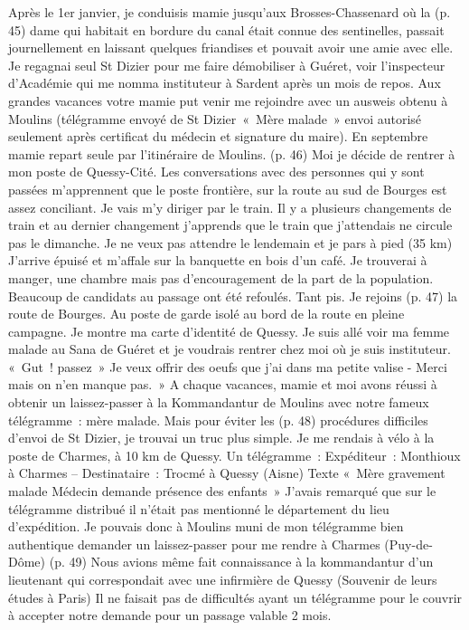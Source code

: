 \documentclass[a5paper,pagesize,10pt,bibtotoc,pointlessnumbers,
normalheadings,DIV=9,twoside=false]{scrbook}
\begin{document}
	Après le 1er janvier, je conduisis mamie jusqu’aux Brosses-Chassenard où la (p. 45) dame qui habitait en bordure du canal était connue des sentinelles, passait journellement en laissant quelques friandises et pouvait avoir une amie avec elle.
	Je regagnai seul St Dizier pour me faire démobiliser à Guéret, voir l’inspecteur d’Académie qui me nomma instituteur à Sardent après un mois de repos.
	Aux grandes vacances votre mamie put venir me rejoindre avec un ausweis obtenu à Moulins (télégramme envoyé de St Dizier « Mère malade » envoi autorisé seulement après certificat du médecin et signature du maire).
	En septembre mamie repart seule par l’itinéraire de Moulins. (p. 46) Moi je décide de rentrer à mon poste de Quessy-Cité. Les conversations avec des personnes qui y sont passées m’apprennent que le poste frontière, sur la route au sud de Bourges est assez conciliant. Je vais m’y diriger par le train. Il y a plusieurs changements de train et au dernier changement j’apprends que le train que j’attendais ne circule pas le dimanche. Je ne veux pas attendre le lendemain et je pars à pied (35 km) J’arrive épuisé et m’affale sur la banquette en bois d’un café. Je trouverai à manger, une chambre mais pas d’encouragement de la part de la population. Beaucoup de candidats au passage ont été refoulés. Tant pis.  Je rejoins (p. 47) la route de Bourges. Au poste de garde isolé au bord de la route en pleine campagne. Je montre ma carte d’identité de Quessy. Je suis allé voir ma femme malade au Sana de Guéret et je voudrais rentrer chez moi où je suis instituteur. « Gut ! passez » Je veux offrir des oeufs que j’ai dans ma petite valise 
	- Merci mais on n’en manque pas. » 
	A chaque vacances, mamie et moi avons réussi à obtenir un laissez-passer à la Kommandantur de Moulins avec notre fameux télégramme : mère malade.
	Mais pour éviter les (p. 48) procédures difficiles d’envoi de St Dizier, je trouvai un truc plus simple. Je me rendais à vélo à la poste de Charmes, à 10 km de Quessy. Un télégramme : Expéditeur : Monthioux à Charmes – Destinataire : Trocmé à Quessy (Aisne) Texte « Mère gravement malade Médecin demande présence des enfants »
	J’avais remarqué que sur le télégramme distribué il n’était pas mentionné le département du lieu d’expédition. Je pouvais donc à Moulins muni de mon télégramme bien authentique demander un laissez-passer pour me rendre à Charmes (Puy-de-Dôme) (p. 49) Nous avions même fait connaissance à la kommandantur d’un lieutenant qui correspondait avec une infirmière de Quessy (Souvenir de leurs études à Paris) Il ne faisait pas de difficultés ayant un télégramme pour le couvrir à accepter notre demande pour un passage valable 2 mois.
\end{document}
